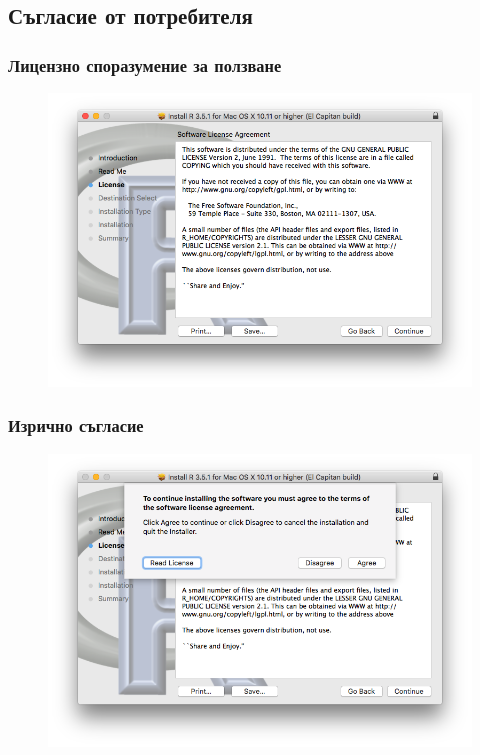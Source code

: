 \documentclass{beamer}
\begin{document}
\subsection{Съгласие от потребителя}

\begin{frame}
\frametitle{Лицензно споразумение за ползване}
\begin{figure}[]\includegraphics[width=\textwidth,height=0.75\textheight]{pic0008}\end{figure}
\end{frame}

\begin{frame}
\frametitle{Изрично съгласие}
\begin{figure}[]\includegraphics[width=\textwidth,height=0.75\textheight]{pic0009}\end{figure}
\end{frame}
\end{document}
